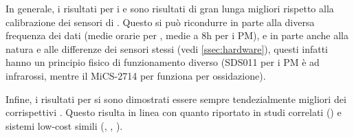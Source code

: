 In generale, i risultati per i  e  sono risultati di gran lunga migliori rispetto alla calibrazione dei sensori di . Questo si può ricondurre in parte alla diversa frequenza dei dati (medie orarie per , medie a 8h per i PM), e in parte anche alla natura e alle differenze dei sensori stessi (vedi \ref{ssec:hardware}), questi infatti hanno un principio fisico di funzionamento diverso (SDS011 per i PM è ad infrarossi, mentre il MiCS-2714 per  funziona per ossidazione).

Infine, i risultati per  si sono dimostrati essere sempre tendezialmente migliori dei corrispettivi . Questo risulta in linea con quanto riportato in studi correlati (\cite{s18092843}) e sistemi low-cost simili (\cite{eval_zikova}, \cite{s17081805}, \cite{s17081922}).




